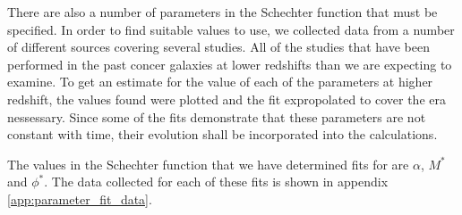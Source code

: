     There are also a number of parameters in the Schechter function that must be specified. In order to find suitable values to use, we collected data from a number of different sources covering several studies. All of the studies that have been performed in the past concer galaxies at lower redshifts than we are expecting to examine. To get an estimate for the value of each of the parameters at higher redshift, the values found were plotted and the fit expropolated to cover the era nessessary. Since some of the fits demonstrate that these parameters are not constant with time, their evolution shall be incorporated into the calculations.

    The values in the Schechter function that we have determined fits for are $\alpha$, $M^{*}$ and $\phi^{*}$. The data collected for each of these fits is shown in appendix \ref{app:parameter_fit_data}.
    

